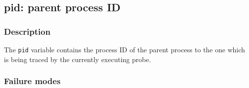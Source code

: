 \clearpage
{}
{}
\label{vars:ppid}
\subsection*{pid: parent process ID}

\subsubsection*{Description}

The \verb|pid| variable contains the process ID of the parent process
to the one which is being traced by the currently executing probe.

\subsubsection*{Failure modes}

